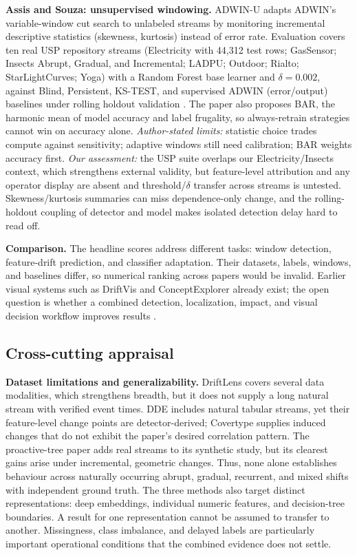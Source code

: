 \documentclass[10pt,a4paper]{article}
\begin{document}
\textbf{Assis and Souza: unsupervised windowing.} ADWIN-U adapts ADWIN's variable-window cut search to unlabeled streams by monitoring incremental descriptive statistics (skewness, kurtosis) instead of error rate. Evaluation covers ten real USP repository streams (Electricity with 44,312 test rows; GasSensor; Insects Abrupt, Gradual, and Incremental; LADPU; Outdoor; Rialto; StarLightCurves; Yoga) with a Random Forest base learner and $\delta=0.002$, against Blind, Persistent, KS-TEST, and supervised ADWIN (error/output) baselines under rolling holdout validation \cite{assisu}. The paper also proposes BAR, the harmonic mean of model accuracy and label frugality, so always-retrain strategies cannot win on accuracy alone. \emph{Author-stated limits:} statistic choice trades compute against sensitivity; adaptive windows still need calibration; BAR weights accuracy first. \emph{Our assessment:} the USP suite overlaps our Electricity/Insects context, which strengthens external validity, but feature-level attribution and any operator display are absent and threshold/$\delta$ transfer across streams is untested. Skewness/kurtosis summaries can miss dependence-only change, and the rolling-holdout coupling of detector and model makes isolated detection delay hard to read off.

\textbf{Comparison.} The headline scores address different tasks: window detection, feature-drift prediction, and classifier adaptation. Their datasets, labels, windows, and baselines differ, so numerical ranking across papers would be invalid. Earlier visual systems such as DriftVis and ConceptExplorer already exist; the open question is whether a combined detection, localization, impact, and visual decision workflow improves results \cite{driftvis,conceptexplorer}.

\subsection*{Cross-cutting appraisal}
\textbf{Dataset limitations and generalizability.} DriftLens covers several data modalities, which strengthens breadth, but it does not supply a long natural stream with verified event times. DDE includes natural tabular streams, yet their feature-level change points are detector-derived; Covertype supplies induced changes that do not exhibit the paper's desired correlation pattern. The proactive-tree paper adds real streams to its synthetic study, but its clearest gains arise under incremental, geometric changes. Thus, none alone establishes behaviour across naturally occurring abrupt, gradual, recurrent, and mixed shifts with independent ground truth. The three methods also target distinct representations: deep embeddings, individual numeric features, and decision-tree boundaries. A result for one representation cannot be assumed to transfer to another. Missingness, class imbalance, and delayed labels are particularly important operational conditions that the combined evidence does not settle.
\end{document}
